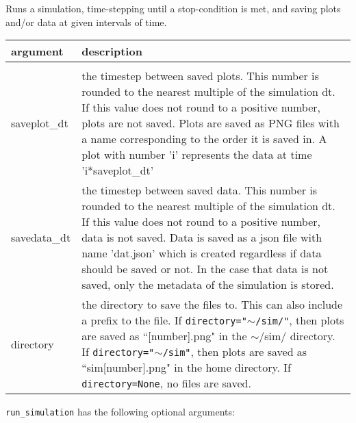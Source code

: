 \documentclass[10pt,a4paper]{article}
\newenvironment{arglist}
    {\begin{center}
    \begin{tabular}{l|p{12cm}}
    argument & description\\
    \hline\\
    }
    { 
    \end{tabular} 
    \end{center}
    }
\begin{document}
Runs a simulation, time-stepping until a stop-condition is met, and saving plots and/or data at given intervals of time.
\begin{arglist}
saveplot\_dt & the timestep between saved plots. This number is rounded
                    to the nearest multiple of the simulation dt. If this
                    value does not round to a positive number, plots are not
                    saved. Plots are saved as PNG files with a name
                    corresponding to the order it is saved in. A plot with
                    number 'i' represents the data at time 'i*saveplot\_dt'\\\hline

savedata\_dt &
                   the timestep between saved data. This number is rounded
                    to the nearest multiple of the simulation dt. If this
                    value does not round to a positive number, data is not
                    saved. Data is saved as a json file with name 'dat.json'
                    which is created regardless if data should be saved or not.
                    In the case that data is not saved, only the metadata of
                    the simulation is stored.\\\hline
        
        directory &
                   the directory to save the files to. This can also include
                    a prefix to the file. If \texttt{directory="$\sim$/sim/"}, then plots are
                    saved as ``[number].png" in the $\sim$/sim/ directory. If
                    \texttt{directory="$\sim$/sim"}, then plots are saved as
                    ``sim[number].png" in the home directory. If \texttt{directory=None}, no files
                    are saved.\\\hline
\end{arglist}

\texttt{run\_simulation} has the following optional arguments:
\end{document}
